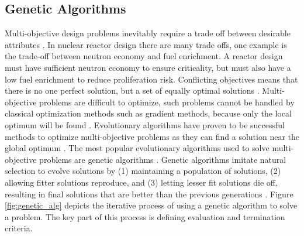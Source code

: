 \documentclass[letterpaper,11pt]{article}
\begin{document}
\subsection{Genetic Algorithms}
Multi-objective design problems inevitably require a trade off between 
desirable attributes \cite{byrne_evolving_2014,simon_sciences_2019}. 
In nuclear reactor design there are many trade offs, one example is the 
trade-off between neutron economy and fuel enrichment. 
A reactor design must have sufficient neutron economy to ensure criticality, 
but must also have a low fuel enrichment to reduce proliferation risk.
Conflicting objectives means that there is no one perfect solution, but a set
of equally optimal solutions \cite{byrne_evolving_2014}.
Multi-objective problems are difficult to optimize, such problems 
cannot be handled by classical optimization methods such as gradient 
methods, because only the local optimum will be found \cite{renner_genetic_2003}. 
Evolutionary algorithms have proven to be successful 
methods to optimize multi-objective problems \cite{krish_practical_2011} as 
they can find a solution near the global optimum \cite{renner_genetic_2003}. 
The most popular evolutionary algorithms used to solve multi-objective 
problems are genetic algorithms 
\cite{byrne_evolving_2014, krish_practical_2011}. 
Genetic algorithms imitate natural selection to evolve solutions 
by (1) maintaining a population of solutions, (2) allowing 
fitter solutions reproduce, and (3) letting lesser fit solutions die off, 
resulting in final solutions that are better than the previous generations 
\cite{renner_genetic_2003}. 
Figure \ref{fig:genetic_alg} depicts the iterative process of using a genetic 
algorithm to solve a problem. 
The key part of this process is defining evaluation and termination criteria. 
\end{document}
